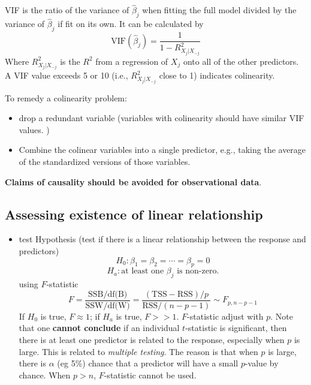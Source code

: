 \documentclass[
  letterpaper,
  DIV=11,
  numbers=noendperiod]{scrreprt}
\providecommand{\tightlist}{%
  \setlength{\itemsep}{0pt}\setlength{\parskip}{0pt}}\usepackage{longtable,booktabs,array}
\begin{document}
\begin{itemize}
  VIF is the ratio of the variance of \(\hat{\beta}_j\) when fitting the
  full model divided by the variance of \(\hat{\beta}_j\) if fit on its
  own. It can be calculated by \[
    \text{VIF}(\hat{\beta}_j) =\frac{1}{1-R^2_{X_j|X_{-j}}}
    \] Where \(R^2_{X_j|X_{-j}}\) is the \(R^2\) from a regression of
  \(X_j\) onto all of the other predictors. A VIF value exceeds 5 or 10
  (i.e., \(R^2_{X_j|X_{-j}}\) close to 1) indicates colinearity.

  To remedy a colinearity problem:

  \begin{itemize}
  \tightlist
  \item
    drop a redundant variable (variables with colinearity should have
    similar VIF values. )
  \item
    Combine the colinear variables into a single predictor, e.g., taking
    the average of the standardized versions of those variables.
  \end{itemize}
\end{itemize}

\textbf{Claims of causality should be avoided for observational data}.

\subsection{Assessing existence of linear
relationship}\label{assessing-existence-of-linear-relationship}

\begin{itemize}
\tightlist
\item
  test Hypothesis (test if there is a linear relationship between the
  response and predictors) \[
  H_0: \beta_1=\beta_2=\cdots = \beta_p=0
  \] \[
  H_a: \text{at least one } \beta_j \text{ is non-zero.}
  \] using \(F\)-statistic \[
  F=\frac{\text{SSB/df(B)}}{\text{SSW/df(W)}}=\frac{(\text{TSS}-\text{RSS})/p}{\text{RSS}/(n-p-1)}\sim F_{p,n-p-1}
  \] If \(H_0\) is true, \(F\approx 1\); if \(H_a\) is true, \(F>>1\).
  \(F\)-statistic adjust with \(p\). Note that one \textbf{cannot
  conclude} if an individual \(t\)-statistic is significant, then there
  is at least one predictor is related to the response, especially when
  \(p\) is large. This is related to \emph{multiple testing}. The reason
  is that when \(p\) is large, there is \(\alpha\) (eg 5\%) chance that
  a predictor will have a small \(p\)-value by chance. When \(p>n\),
  \(F\)-statistic cannot be used.
\end{itemize}
\end{document}
